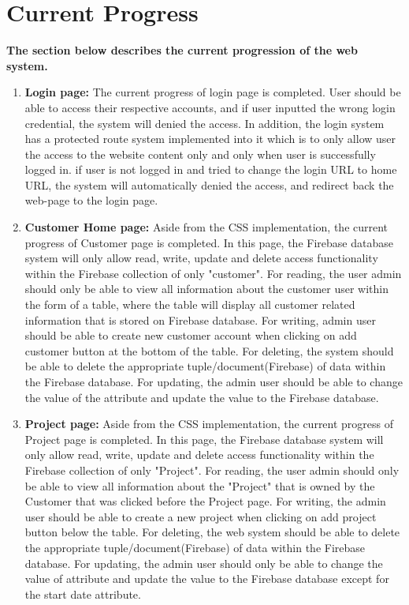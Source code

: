 \documentclass[onecolumn, draftclsnofoot,10pt, compsoc]{IEEEtran}
\begin{document}
\section{Current Progress} 
 \textbf{The section below describes the current progression of the web system.}\newline

\begin{enumerate}
\item  \textbf{Login page:}\newline
The current progress of login page is completed. User should be able to access their respective accounts, and if user inputted the wrong login credential, the system will denied the access. In addition, the login system has a protected route system implemented into it which is to only allow user the access to the website content only and only when user is successfully logged in. if user is not logged in and tried to change the login URL to home URL, the system will automatically denied the access, and redirect back the web-page to the login page.\newline

 \item  \textbf{Customer Home page:}\newline
 Aside from the CSS implementation, the current progress of Customer page is completed. In this page, the Firebase database system will only allow read, write, update and delete access functionality within the Firebase collection of only "customer". For reading, the user admin should only be able to view all information about the customer user within the form of a table, where the table will display all customer related information that is stored on Firebase database. For writing, admin user should be able to create new customer account when clicking on add customer button at the bottom of the table. For deleting, the system should be able to delete the appropriate tuple/document(Firebase) of data within the Firebase database. For updating, the admin user should be able to change the value of the attribute and update the value to the Firebase database.  \newline

 \newpage
 
  \item  \textbf{Project page:}\newline
  Aside from the CSS implementation, the current progress of Project page is completed. In this page, the Firebase database system will only allow read, write, update and delete access functionality within the Firebase collection of only "Project". For reading, the user admin should only be able to view all information about the "Project" that is owned by the Customer that was clicked before the Project page. For writing, the admin user should be able to create a new project when clicking on add project button below the table. For deleting, the web system should be able to delete the appropriate tuple/document(Firebase) of data within the Firebase database. For updating, the admin user should only be able to change the value of attribute and update the value to the Firebase database except for the start date attribute. \newline 
  

\end{enumerate}
\end{document}
